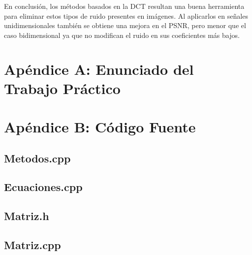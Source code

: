 \documentclass[a4paper,10pt,twoside]{article}
\begin{document}
En conclusión, los métodos basados en la DCT resultan una buena herramienta para eliminar estos tipos de ruido presentes en imágenes. Al aplicarlos en señales unidimensionales también se obtiene una mejora en el PSNR, pero menor que el caso bidimensional ya que no modifican el ruido en sus coeficientes más bajos.



\newpage

\section{Apéndice A: Enunciado del Trabajo Práctico}





\newpage

\section{Apéndice B: Código Fuente}

\subsection{Metodos.cpp}


\subsection{Ecuaciones.cpp}


\subsection{Matriz.h}


\subsection{Matriz.cpp}

\end{document}

